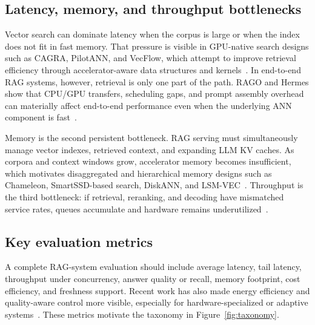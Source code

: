 \documentclass[acmsmall,screen]{acmart}
\begin{document}
\subsection{Latency, memory, and throughput bottlenecks}

Vector search can dominate latency when the corpus is large or when the index does not fit in fast memory. That pressure is visible in GPU-native search designs such as CAGRA, PilotANN, and VecFlow, which attempt to improve retrieval efficiency through accelerator-aware data structures and kernels~\cite{cagra2024,pilotann2025,vecflow2026}. In end-to-end RAG systems, however, retrieval is only one part of the path. RAGO and Hermes show that CPU/GPU transfers, scheduling gaps, and prompt assembly overhead can materially affect end-to-end performance even when the underlying ANN component is fast~\cite{rago2025,hermes2025}.

Memory is the second persistent bottleneck. RAG serving must simultaneously manage vector indexes, retrieved context, and expanding LLM KV caches. As corpora and context windows grow, accelerator memory becomes insufficient, which motivates disaggregated and hierarchical memory designs such as Chameleon, SmartSSD-based search, DiskANN, and LSM-VEC~\cite{smartssd2024,chameleon2025,diskann2019,lsmvec2025}. Throughput is the third bottleneck: if retrieval, reranking, and decoding have mismatched service rates, queues accumulate and hardware remains underutilized~\cite{piperag2025,patchwork2025,aquapipe2025}.

\subsection{Key evaluation metrics}

A complete RAG-system evaluation should include average latency, tail latency, throughput under concurrency, answer quality or recall, memory footprint, cost efficiency, and freshness support. Recent work has also made energy efficiency and quality-aware control more visible, especially for hardware-specialized or adaptive systems~\cite{metis2025,ndsearch2024,smartssd2024}. These metrics motivate the taxonomy in Figure~\ref{fig:taxonomy}.
\end{document}
